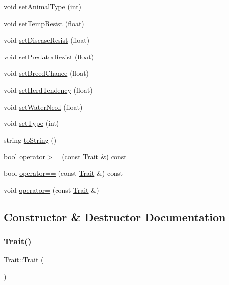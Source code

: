 \begin{DoxyCompactItemize}
\item 
void \hyperlink{class_trait_a4502b8d4b670a9aa39a49cfa394e31e1}{set\+Animal\+Type} (int)
\item 
void \hyperlink{class_trait_afb95de8d08b9e6509d670af19db03d9d}{set\+Temp\+Resist} (float)
\item 
void \hyperlink{class_trait_afd78c8d97e46ea8ba6b8240034419b1b}{set\+Disease\+Resist} (float)
\item 
void \hyperlink{class_trait_a952e008b31b2da8206319fd8b5bc4409}{set\+Predator\+Resist} (float)
\item 
void \hyperlink{class_trait_aec781297ddedcbec15a369453fea9557}{set\+Breed\+Chance} (float)
\item 
void \hyperlink{class_trait_ab5881ed05c689ee84de9997aa7243478}{set\+Herd\+Tendency} (float)
\item 
void \hyperlink{class_trait_abba488e319c1419698d6d991c70f5900}{set\+Water\+Need} (float)
\item 
void \hyperlink{class_trait_a4409499a3a87f38106272489ecab2007}{set\+Type} (int)
\item 
string \hyperlink{class_trait_a035698aed4673b26e21e9d8d787fe3dc}{to\+String} ()
\item 
bool \hyperlink{class_trait_abe35dcc6c7da6345d3f862082cc7f956}{operator$>$=} (const \hyperlink{class_trait}{Trait} \&) const
\item 
bool \hyperlink{class_trait_a04b0daee14f5cfd70e7e5ac485ce87ec}{operator==} (const \hyperlink{class_trait}{Trait} \&) const
\item 
void \hyperlink{class_trait_a88a21860c203813df4ecdcfe37758f88}{operator=} (const \hyperlink{class_trait}{Trait} \&)
\end{DoxyCompactItemize}


\subsection{Constructor \& Destructor Documentation}
\mbox{\label{class_trait_aae36b201023c346213c0e5bcc1c7922f}} 
\subsubsection{\texorpdfstring{Trait()}{Trait()}}
{\footnotesize\ttfamily Trait\+::\+Trait (\begin{DoxyParamCaption}{ }\end{DoxyParamCaption})}

